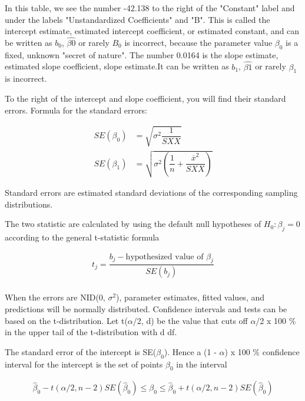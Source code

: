\documentclass{article}
\begin{document}
    In this table, we see the number -42.138 to the right of the "Constant" label and under the labels "Unstandardized Coefficients" and "B". This is called the intercept estimate, estimated intercept coefficient, or estimated constant, and can be written as $b_{0}$, $\hat{\beta{0}}$ or rarely $B_{0}$ is incorrect, because the parameter value $\beta_{0}$ is a fixed, unknown "secret of nature". The number 0.0164 is the slope estimate, estimated slope coefficient, slope estimate.It can be written as $b_{1}$, $\hat{\beta{1}}$ or rarely $\beta_{1}$ is incorrect.
    
    To the right of the intercept and slope coefficient, you will find their standard errors. Formula for the standard errors: 
    
    \begin{align}
        SE(\beta_{0}) &= \sqrt{\sigma^2 \dfrac{1}{SXX}} \nonumber \\ 
        SE(\beta_{1}) &= \sqrt{\sigma^2 \left( \dfrac{1}{n} + \dfrac{\overline{x}^2}{SXX}\right)} \nonumber
    \end{align}
    
    Standard errors are estimated standard deviations of the corresponding sampling distributions. 
    
    The two statistic are calculated by using  the default null hypotheses of $H_{0}: \beta_{j} = 0$ according to the general t-statistic formula
    
    \begin{align}
        t_{j} = \dfrac{b_{j} - \text{hypothesized value of } \beta_{j}}{SE(b_{j})} \nonumber \\ 
    \end{align}
    
    When the errors are NID(0, $\sigma^2$), parameter estimates, fitted values, and predictions will be normally distributed. Confidence intervals and tests can be based on the t-distribution. Let t($\alpha$/2, d) be the value that cuts off $\alpha$/2 x 100 $\%$ in the upper tail of the t-distribution with d df.
    
    The standard error of the intercept is SE($\beta_{0}$). Hence a (1 - $\alpha$) x 100 $\%$ confidence interval for the intercept is the set of points $\beta_{0}$ in the interval 
    
    \begin{align}
        \hat\beta_{0} - t(\alpha /2, n - 2)SE(\hat\beta_{0}) \le \beta_{0} \le \hat\beta_{0} + t(\alpha /2, n - 2)SE(\hat\beta_{0}) \nonumber 
    \end{align}
    
\end{document}

